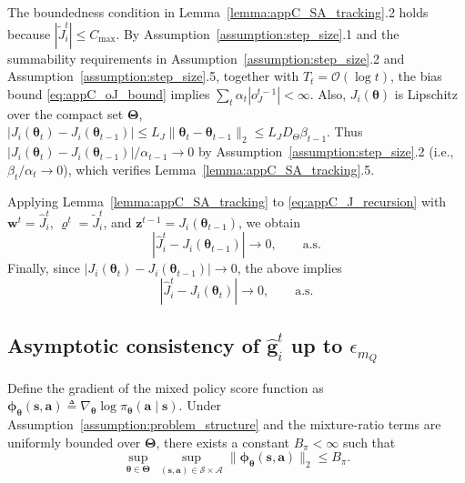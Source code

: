 \documentclass{IEEEtran}
\begin{document}
The boundedness condition in Lemma~\ref{lemma:appC_SA_tracking}.2 holds because $|\tilde J_i^t|\le C_{\max}$.
By Assumption~\ref{assumption:step_size}.1 and the summability requirements in Assumption~\ref{assumption:step_size}.2 and Assumption~\ref{assumption:step_size}.5, together with $T_t=\mathcal{O}(\log t)$, the bias bound \eqref{eq:appC_oJ_bound} implies $\sum_t \alpha_t |o_J^{t-1}|<\infty$. Also, $J_i(\boldsymbol{\theta})$ is Lipschitz over the compact set $\boldsymbol{\Theta}$, $|J_i(\boldsymbol{\theta}_{t})-J_i(\boldsymbol{\theta}_{t-1})|\le L_J\|\boldsymbol{\theta}_{t}-\boldsymbol{\theta}_{t-1}\|_2\le L_J D_{\Theta}\beta_{t-1}$. 
Thus $|J_i(\boldsymbol{\theta}_{t})-J_i(\boldsymbol{\theta}_{t-1})|/\alpha_{t-1}\to 0$ by Assumption~\ref{assumption:step_size}.2 (i.e., $\beta_t/\alpha_t\to 0$), which verifies Lemma~\ref{lemma:appC_SA_tracking}.5.

Applying Lemma~\ref{lemma:appC_SA_tracking} to \eqref{eq:appC_J_recursion} with
$\boldsymbol{w}^{t}=\hat J_i^{t}$,
$\boldsymbol{\varrho}^{t}=\tilde J_i^{t}$, and
$\boldsymbol{z}^{t-1}=J_i(\boldsymbol{\theta}_{t-1})$,
we obtain
\begin{equation}
|\hat J_i^{t}-J_i(\boldsymbol{\theta}_{t-1})|\to 0,\qquad \text{a.s.}
\end{equation}
Finally, since $|J_i(\boldsymbol{\theta}_{t})-J_i(\boldsymbol{\theta}_{t-1})|\to 0$, the above implies
\begin{equation}
|\hat J_i^{t}-J_i(\boldsymbol{\theta}_{t})|\to 0,\qquad \text{a.s.}
\label{eq:appC_J_consistency}
\end{equation}

\subsection{Asymptotic consistency of $\hat{\boldsymbol{g}}_i^t$ up to $\epsilon_{m_Q}$}

Define the gradient of the mixed policy  score function as $\boldsymbol{\phi}_{\boldsymbol{\theta}}(\boldsymbol{s},\boldsymbol{a})\triangleq\nabla_{\boldsymbol{\theta}}\log\pi_{\boldsymbol{\theta}}(\boldsymbol{a}\mid\boldsymbol{s})$. 
Under Assumption~\ref{assumption:problem_structure} and the mixture-ratio terms are uniformly bounded over $\boldsymbol{\Theta}$, there exists a constant $B_{\pi}<\infty$ such that
\begin{equation}
\sup_{\boldsymbol{\theta}\in\boldsymbol{\Theta}}\ \sup_{(\boldsymbol{s},\boldsymbol{a})\in\mathcal{S}\times\mathcal{A}}
\big\|\boldsymbol{\phi}_{\boldsymbol{\theta}}(\boldsymbol{s},\boldsymbol{a})\big\|_2\le B_{\pi}.
\label{eq:appC_score_bound}
\end{equation}
\end{document}
